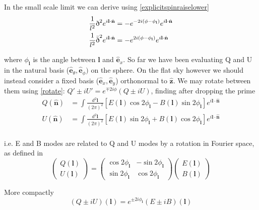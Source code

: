 \documentclass[a4paper,10pt]{article}
\renewcommand{\v}[1]{\mathbf{#1}}
\newcommand{\finttwo}[1]{\int \frac{d^2 \v{#1}}{(2\pi)^2}}
\newcommand{\unit}[1]{\hat{\v{#1}}}
\newcommand{\sr}{\text{\normalfont\dh}}
\renewcommand{\sl}{\bar{\text{\normalfont\dh}}}
\begin{document}
In the small scale limit we can derive using \ref{explicitspinraiselower}
\begin{equation}\begin{split}
\frac{1}{l^2}\sr^2e^{i\v{l}\cdot\unit{n}} &= -e^{-2i(\phi-\phi_\v{l})}e^{i\v{l}\cdot\unit{n}}\\
\frac{1}{l^2}\sl^2e^{i\v{l}\cdot\unit{n}} &= -e^{2i(\phi-\phi_\v{l})}e^{i\v{l}\cdot\unit{n}}
\end{split}\end{equation}

where $\phi_\v{l}$ is the angle between $\v{l}$ and $\unit{e}_x$. So far we have been evaluating Q and U in the natural basis ($\unit{e}_\theta, \unit{e}_\phi)$ on the sphere. On the flat sky however we should instead consider a fixed basis ($\unit{e}_x, \unit{e}_y$) orthonormal to $\unit{z}$. We may rotate between them using \ref{rotate}: $Q'\pm iU' = e^{\mp 2i\phi}(Q\pm iU)$, finding after dropping the prime
\begin{equation}\begin{split}
Q(\unit{n}) &= \finttwo{l} [E(\v{l})\cos{2\phi_\v{l}}-B(\v{l})\sin{2\phi_\v{l}}]  e^{i\v{l}\cdot\unit{n}}\\
U(\unit{n}) &= \finttwo{l} [E(\v{l})\sin{2\phi_\v{l}}+B(\v{l})\cos{2\phi_\v{l}}]  e^{i\v{l}\cdot\unit{n}}\\
\end{split}\end{equation}

i.e. E and B modes are related to Q and U modes by a rotation in Fourier space, as defined in \cite{baldauf}
\begin{equation}
\begin{pmatrix}
Q(\v{l})\\
U(\v{l}) 
\end{pmatrix}
=
\begin{pmatrix}
\cos{2\phi_\v{l}} & -\sin{2\phi_\v{l}}\\ 
\sin{2\phi_\v{l}} & \cos{2\phi_\v{l}}
\end{pmatrix}
\begin{pmatrix}
E(\v{l})\\
B(\v{l}) 
\end{pmatrix}
\end{equation}

More compactly
\begin{equation}
(Q\pm iU)(\v{l}) = e^{\pm2i\phi_\v{l}}(E\pm iB)(\v{l})
\label{QUrotateflat}
\end{equation}
\end{document}
